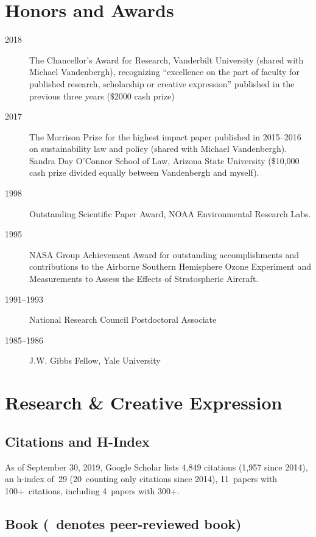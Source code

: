 \documentclass[10pt]{article}
\begin{document}
\section{Honors and Awards}
\begin{description}
\item[2018] The Chancellor's Award for Research, Vanderbilt University (shared with Michael Vandenbergh), recognizing ``excellence on the part of faculty for published research, scholarship or creative expression'' published in the previous three years (\$2000 cash prize)
\item[2017] The Morrison Prize for the highest impact paper published in 2015--2016 on sustainability law and policy (shared with Michael Vandenbergh). Sandra Day O'Connor School of Law, Arizona State University (\$10,000 cash prize divided equally between Vandenbergh and myself).
\item[1998] Outstanding Scientific Paper Award, NOAA Environmental Research Labs.
\item[1995] NASA Group Achievement Award for outstanding accomplishments and contributions to the Airborne Southern Hemisphere Ozone Experiment and Measurements to Assess the Effects of Stratospheric Aircraft.
\item[1991--1993] National Research Council Postdoctoral Associate
\item[1985--1986] J.W. Gibbs Fellow, Yale University
\end{description}

\clearpage
\section{Research \& Creative Expression}
    \subsection{Citations and H-Index}
        As of September 30, 2019, Google Scholar lists
        4,849 citations (1,957 since 2014),
        an h-index of~29 (20~counting only citations since 2014),
        11~papers with 100+~citations, including 4~papers with 300+.
    \nocite{*}%
    \subsection[Book]{Book (\textdagger\ denotes peer-reviewed book)}
        \begin{refsection}
            \nocite{*}
            \printbibliography[heading=none,type=book]
        \end{refsection}
\end{document}
